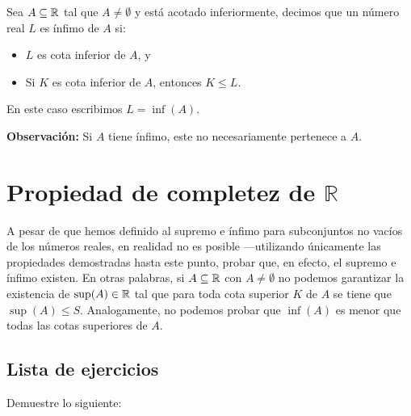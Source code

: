  Sea $A\subseteq \mathbb{R}$ tal que $A\neq \emptyset$ y está acotado inferiormente, decimos que un número real $L$ es ínfimo de $A$ si: \begin{itemize}
 \item $L$ es cota inferior de $A$, y
 \item Si $K$ es cota inferior de $A$, entonces $K\leq L$.
\end{itemize}

En este caso escribimos $L=\inf(A)$.

\textbf{Observación:} Si $A$ tiene ínfimo, este no necesariamente pertenece a $A$.

\section*{Propiedad de completez de \(\mathbb{R}\)}

A pesar de que hemos definido al supremo e ínfimo para subconjuntos no vacíos de los números reales, en realidad no es posible ---utilizando únicamente las propiedades demostradas hasta este punto, probar que, en efecto, el supremo e ínfimo existen. En otras palabras, si $A\subseteq \mathbb{R}$ con $A\neq \emptyset$ no podemos garantizar la existencia de $\sup(A)\in \mathbb{R}$ tal que para toda cota superior $K$ de $A$ se tiene que $\sup(A)\leq S$. Analogamente, no podemos probar que $\inf(A)$ es menor que todas las cotas superiores de $A$. 

\subsection*{Lista de ejercicios}

Demuestre lo siguiente:

